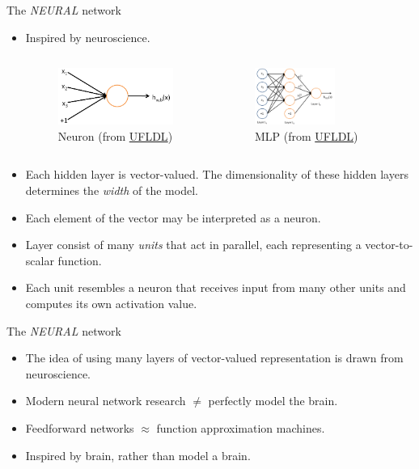 \documentclass[10pt]{beamer}
\begin{document}
	\begin{frame}{The \emph{NEURAL} network}
		\begin{itemize}
			\item Inspired by neuroscience.
			\begin{columns}
				\begin{figure}
					\includegraphics[height=5em]{figures/neuron.png}
					\caption{Neuron (from \href{http://deeplearning.stanford.edu/wiki/index.php/File:SingleNeuron.png}{UFLDL})}
				\end{figure}
			
				\begin{figure}
					\includegraphics[height=5em]{figures/multilayer-perceptron.png}
					\caption{MLP (from \href{http://ufldl.stanford.edu/wiki/index.php/File:Network331.png}{UFLDL})}
				\end{figure}
					
			\end{columns}
			\item Each hidden layer is vector-valued. The dimensionality of these hidden layers determines the \emph{width} of the model.
			\item Each element of the vector may be interpreted as a neuron.
			\item Layer consist of many \emph{units} that act in parallel, each representing a vector-to-scalar function.
			\item Each unit resembles a neuron that receives input from many other units and computes its own activation value.
		\end{itemize}
	\end{frame}

	\begin{frame}{The \emph{NEURAL} network}
		\begin{itemize}
			\item The idea of using many layers of vector-valued representation is drawn from neuroscience.
			\item Modern neural network research $\ne$ perfectly model the brain.
			\item Feedforward networks $\approx$ function approximation machines.
			\item Inspired by brain, rather than model a brain.
		\end{itemize}
	\end{frame}
	
\end{document}
